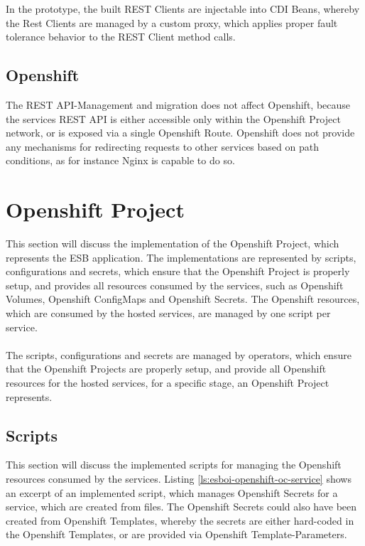 In the prototype, the built REST Clients are injectable into CDI Beans, whereby the Rest Clients are managed by a custom proxy, which applies proper fault tolerance behavior to the REST Client method calls.

\subsection{Openshift}
\label{sec:esbi-api-openshift}
The REST API-Management and migration does not affect Openshift, because the services REST API is either accessible only within the Openshift Project network, or is exposed via a single Openshift Route. Openshift does not provide any mechanisms for redirecting requests to other services based on path conditions, as for instance Nginx is capable to do so. 

\section{Openshift Project}
\label{sec:esbi-openshift}
This section will discuss the implementation of the Openshift Project, which represents the ESB application. The implementations are represented by scripts, configurations and secrets, which ensure that the Openshift Project is properly setup, and provides all resources consumed by the services, such as Openshift Volumes, Openshift ConfigMaps and Openshift Secrets. The Openshift resources, which are consumed by the hosted services, are managed by one script per service. 
\\ \\
The scripts, configurations and secrets are managed by operators, which ensure that the Openshift Projects are properly setup, and provide all Openshift resources for the hosted services, for a specific stage, an Openshift Project represents.

\subsection{Scripts}
\label{sec:esbi-openshift-secrets}
This section will discuss the implemented scripts for managing the Openshift resources consumed by the services. Listing \vref{ls:esboi-openshift-oc-service} shows an excerpt of an implemented script, which manages Openshift Secrets for a service, which are created from files. The Openshift Secrets could also have been created from Openshift Templates, whereby the secrets are either hard-coded in the Openshift Templates, or are provided via Openshift Template-Parameters.


